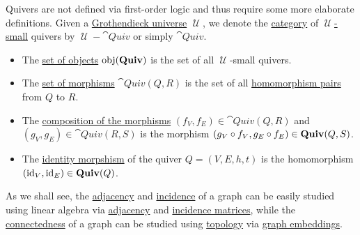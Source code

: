 \begin{definition}
\begin{thmenum}
    Quivers are not defined via first-order logic and thus require some more elaborate definitions. Given a \hyperref[def:grothendieck_universe]{Grothendieck universe} \( \mscrU \), we denote the \hyperref[def:category]{category} of \hyperref[def:large_and_small_sets]{\( \mscrU \)-small} quivers by \( \mscrU-\cat{Quiv} \) or simply \( \cat{Quiv} \).
    \begin{itemize}
      \item The \hyperref[def:category/objects]{set of objects} \( \operatorname{obj}(\operatorname{\mathbf{Quiv}}) \) is the set of all \( \mscrU \)-small quivers.
      \item The \hyperref[def:category/morphisms]{set of morphisms} \( \cat{Quiv}(Q, R) \) is the set of all \hyperref[def:theory_of_graphs/quiver_homomorphism]{homomorphism pairs} from \( Q \) to \( R \).

      \item The \hyperref[def:category/composition]{composition of the morphisms} \( (f_V, f_E) \in \cat{Quiv}(Q, R) \) and \( (g_V, g_E) \in \cat{Quiv}(R, S) \) is the morphism \( (g_V \mathbin \circ f_V, g_E \mathbin \circ f_E) \in \operatorname{\mathbf{Quiv}}(Q, S) \).

      \item The \hyperref[def:category/identity]{identity morpshism} of the quiver \( Q = (V, E, h, t) \) is the homomorphism \( (\operatorname{id}_V, \operatorname{id}_E) \in \operatorname{\mathbf{Quiv}}(Q) \).
    \end{itemize}
  \end{thmenum}
\end{definition}

\begin{remark}\label{rem:graphs_linear_algebra_and_topology}
  As we shall see, the \hyperref[def:graph/adjacent_vertices]{adjacency} and \hyperref[def:graph/incidence]{incidence} of a graph can be easily studied using linear algebra via \hyperref[def:graph_adjacency_matrix]{adjacency} and \hyperref[def:multigraph_incidence_matrix]{incidence matrices}, while the \hyperref[def:quiver_connectedness]{connectedness} of a graph can be studied using \hyperref[def:quiver_connectedness]{topology} via \hyperref[def:quiver_geometric_relization/embedding]{graph embeddings}.
\end{remark}

